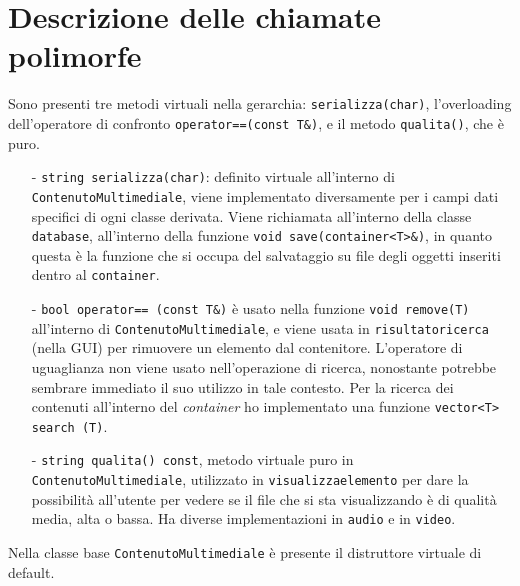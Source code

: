 \documentclass[a4paper,10pt]{article}
\begin{document}
\section{Descrizione delle chiamate polimorfe}
Sono presenti tre metodi virtuali nella gerarchia: \texttt{serializza(char)}, l'overloading dell'operatore di confronto \texttt{operator==(const T\&)}, e il metodo \texttt{qualita()}, che è puro.
\begin{enumerate}
	\item [-] \texttt{string serializza(char)}: definito virtuale all'interno di \texttt{ContenutoMultimediale}, viene implementato diversamente per i campi dati specifici di ogni classe derivata. Viene richiamata all'interno della classe \texttt{database}, all'interno della funzione \texttt{void save(container<T>\&)}, in quanto questa è la funzione che si occupa del salvataggio su file degli oggetti inseriti dentro al \texttt{container}.
	\item [-] \texttt{bool operator== (const T\&)} è usato nella funzione \texttt{void remove(T)} all'interno di \texttt{ContenutoMultimediale}, e viene usata in \texttt{risultatoricerca} (nella GUI) per rimuovere un elemento dal contenitore. L'operatore di uguaglianza non viene usato nell'operazione di ricerca, nonostante potrebbe sembrare immediato il suo utilizzo in tale contesto. Per la ricerca dei contenuti all'interno del \textit{container} ho implementato una funzione \texttt{vector<T> search (T)}.
	\item [-] \texttt{string qualita() const}, metodo virtuale puro in \texttt{ContenutoMultimediale}, utilizzato in \texttt{visualizzaelemento} per dare la possibilità all'utente per vedere se il file che si sta visualizzando è di qualità media, alta o bassa. Ha diverse implementazioni in \texttt{audio} e in \texttt{video}.
\end{enumerate}
Nella classe base \texttt{ContenutoMultimediale} è presente il distruttore virtuale di default.
\end{document}
